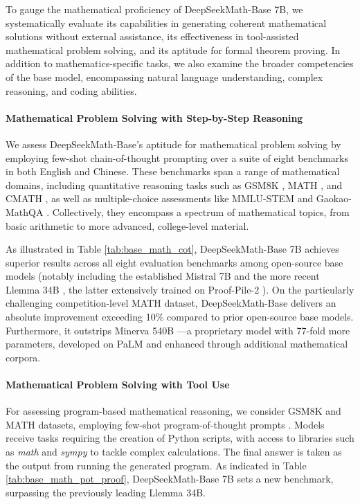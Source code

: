 To gauge the mathematical proficiency of DeepSeekMath-Base 7B, we systematically evaluate its capabilities in generating coherent mathematical solutions without external assistance, its effectiveness in tool-assisted mathematical problem solving, and its aptitude for formal theorem proving. In addition to mathematics-specific tasks, we also examine the broader competencies of the base model, encompassing natural language understanding, complex reasoning, and coding abilities.

\paragraph{Mathematical Problem Solving with Step-by-Step Reasoning}

We assess DeepSeekMath-Base’s aptitude for mathematical problem solving by employing few-shot chain-of-thought prompting \citep{cot} over a suite of eight benchmarks in both English and Chinese. These benchmarks span a range of mathematical domains, including quantitative reasoning tasks such as GSM8K \citep{gsm8k}, MATH \citep{MATH}, and CMATH \citep{wei2023cmath}, as well as multiple-choice assessments like MMLU-STEM \citep{mmlu} and Gaokao-MathQA \citep{agieval}. Collectively, they encompass a spectrum of mathematical topics, from basic arithmetic to more advanced, college-level material.

As illustrated in Table \ref{tab:base_math_cot}, DeepSeekMath-Base 7B achieves superior results across all eight evaluation benchmarks among open-source base models (notably including the established Mistral 7B \citep{mistral} and the more recent Llemma 34B \citep{llemma}, the latter extensively trained on Proof-Pile-2 \citep{llemma}). On the particularly challenging competition-level MATH dataset, DeepSeekMath-Base delivers an absolute improvement exceeding 10\% compared to prior open-source base models. Furthermore, it outstrips Minerva 540B \citep{minerva}—a proprietary model with 77-fold more parameters, developed on PaLM \citep{palm} and enhanced through additional mathematical corpora.

\paragraph{Mathematical Problem Solving with Tool Use}

For assessing program-based mathematical reasoning, we consider GSM8K and MATH datasets, employing few-shot program-of-thought prompts \citep{pot,pal}. Models receive tasks requiring the creation of Python scripts, with access to libraries such as \textit{math} and \textit{sympy} to tackle complex calculations. The final answer is taken as the output from running the generated program. As indicated in Table \ref{tab:base_math_pot_proof}, DeepSeekMath-Base 7B sets a new benchmark, surpassing the previously leading Llemma 34B.

